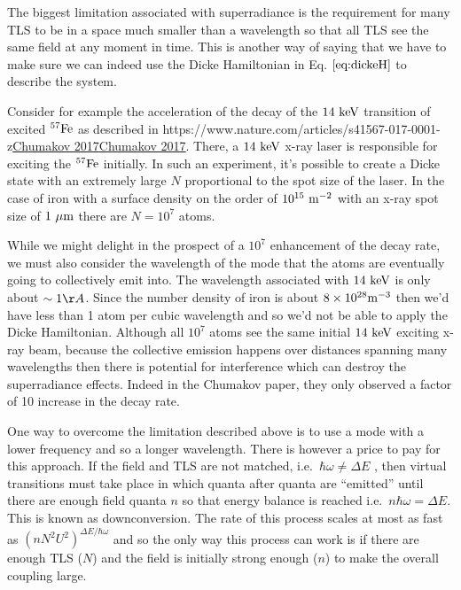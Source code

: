 \documentclass[
]{article}
\let\oldhref\href
\renewcommand{\href}[2]{\ifx#1\urlprefix\oldhref{#1}{#2}\else\uline{\oldhref{#1}{#2}}\fi}
\renewcommand{\[}{\begin{equation}}
\renewcommand{\]}{\end{equation}}
\begin{document}
The biggest limitation associated with superradiance is the requirement
for many TLS to be in a space much smaller than a wavelength so that all
TLS see the same field at any moment in time. This is another way of
saying that we have to make sure we can indeed use the Dicke Hamiltonian
in Eq. \(\ref{eq:dickeH}\) to describe the system.

Consider for example the acceleration of the decay of the
\(\rm 14\ keV\) transition of excited \(\rm ^{57}Fe\) as described in
\href{https://www.nature.com/articles/s41567-017-0001-z}{Chumakov 2017}.
There, a \(\rm 14\ keV\) x-ray laser is responsible for exciting the
\(\rm ^{57}Fe\) initially. In such an experiment, it's possible to
create a Dicke state with an extremely large \(N\) proportional to the
spot size of the laser. In the case of iron with a surface density on
the order of \(10^{15} \ \rm m^{-2}\) with an x-ray spot size of
\(1 \ \rm \mu m\) there are \(N=10^7\) atoms.

While we might delight in the prospect of a \(10^{7}\) enhancement of
the decay rate, we must also consider the wavelength of the mode that
the atoms are eventually going to collectively emit into. The wavelength
associated with \(\rm 14\ keV\) is only about \(\sim 1\AA\). Since the
number density of iron is about \(8\times 10^{28} \rm m^{-3}\) then we'd
have less than 1 atom per cubic wavelength and so we'd not be able to
apply the Dicke Hamiltonian. Although all \(10^{7}\) atoms see the same
initial \(\rm 14\ keV\) exciting x-ray beam, because the collective
emission happens over distances spanning many wavelengths then there is
potential for interference which can destroy the superradiance effects.
Indeed in the Chumakov paper, they only observed a factor of 10 increase
in the decay rate.

One way to overcome the limitation described above is to use a mode with
a lower frequency and so a longer wavelength. There is however a price
to pay for this approach. If the field and TLS are not matched,
i.e.~\(\hbar\omega \neq \Delta E\) , then virtual transitions must take
place in which quanta after quanta are ``emitted'' until there are
enough field quanta \(n\) so that energy balance is reached
i.e.~\(n\hbar\omega = \Delta E\). This is known as downconversion. The
rate of this process scales at most as fast as
\((nN^2U^2)^{\Delta E / \hbar\omega}\) and so the only way this process
can work is if there are enough TLS (\(N\)) and the field is initially
strong enough (\(n\)) to make the overall coupling large.
\end{document}
